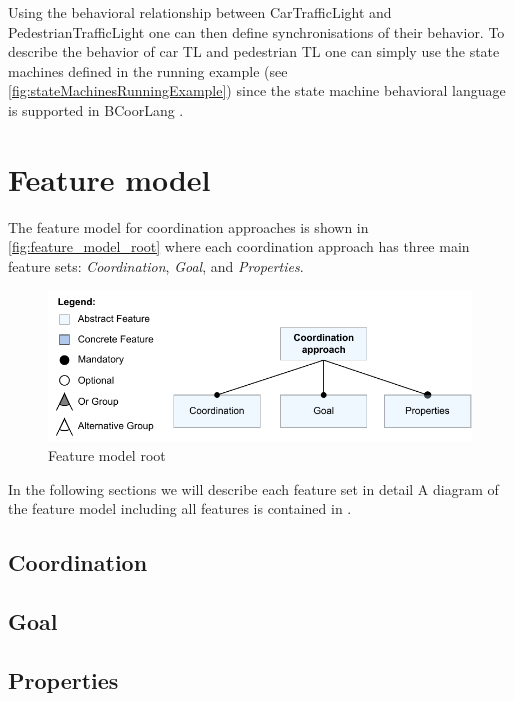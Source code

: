 \documentclass[runningheads]{llncs}
\begin{document}
Using the behavioral relationship between \textsf{CarTrafficLight} and \textsf{PedestrianTrafficLight} one can then define synchronisations of their behavior.
To describe the behavior of car TL and pedestrian TL one can simply use the state machines defined in the running example (see \autoref{fig:stateMachinesRunningExample}) since the state machine behavioral language is supported in BCoorLang \cite{krauterBehavioralConsistencyMultimodeling2023}.


\section{Feature model} \label{sec:features}
The feature model for coordination approaches is shown in \autoref{fig:feature_model_root} where each coordination approach has three main feature sets: \textit{Coordination}, \textit{Goal}, and \textit{Properties}.

\begin{figure}[ht]
	\centering
	\includegraphics[width=1\textwidth]{images/root}
	\caption{Feature model root}
	\label{fig:feature_model_root}
\end{figure}

In the following sections we will describe each feature set in detail
A diagram of the feature model including all features is contained in \cite{krauterCoordination2024Artifacts2024}.

\subsection{Coordination}
\subsection{Goal}
\subsection{Properties}
\end{document}
